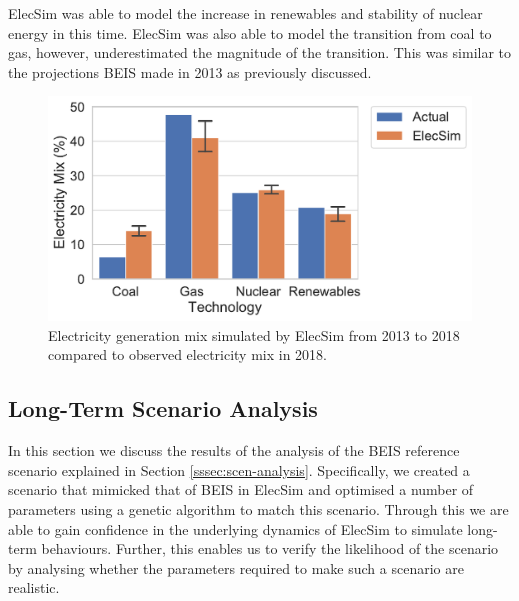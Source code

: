 ElecSim was able to model the increase in renewables and stability of nuclear energy in this time. ElecSim was also able to model the transition from coal to gas, however, underestimated the magnitude of the transition. This was similar to the projections BEIS made in 2013 as previously discussed.

\begin{figure}
	\centering
	\includegraphics[width=\textwidth]{Chapter4/figures/e-Energy-2020/results/best_run_coal_dropout_95_ci.pdf}
	\caption{Electricity generation mix simulated by ElecSim from 2013 to 2018 compared to observed electricity mix in 2018.}
	\label{fig:uk_validated_results_2018}
\end{figure}








\subsection{Long-Term Scenario Analysis}

In this section we discuss the results of the analysis of the BEIS reference scenario explained in Section \ref{sssec:scen-analysis}. Specifically, we created a scenario that mimicked that of BEIS in ElecSim and optimised a number of parameters using a genetic algorithm to match this scenario. Through this we are able to gain confidence in the underlying dynamics of ElecSim to simulate long-term behaviours. Further, this enables us to verify the likelihood of the scenario by analysing whether the parameters required to make such a scenario are realistic.

